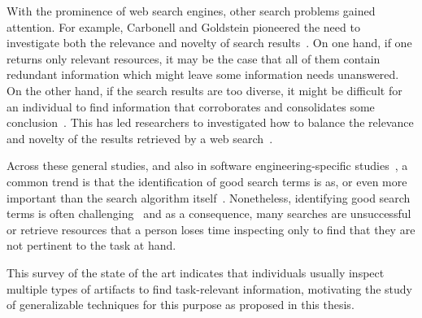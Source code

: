 With the prominence of web search engines, other search problems gained attention.
For example,  Carbonell and Goldstein pioneered the need 
to investigate both the relevance and novelty of search results~\cite{Carbonell1998}.
On one hand, if one returns only relevant resources, it may be the case that all of them contain redundant information 
which might leave some information needs unanswered. 
On the other hand, if the search results are too diverse, it might be difficult for an individual 
to find information that corroborates and consolidates some conclusion~\cite{clark2013relevance}.  
This has led researchers to investigated 
how to balance the relevance and novelty of the results retrieved
by a web search~\cite{najork2001, rafiei2010, vieira2011}. 





Across these general studies, and also in software engineering-specific studies~\cite{Starke2009, Brandt2009a, DeGraaf2014},
a common trend is that the identification of good search terms is as, or even more
important than the search algorithm itself~\cite{Kevic2014}. 
Nonetheless, identifying good search terms is often challenging~\cite{novotny2004don, Haiduc2013} and 
as a consequence, many searches are unsuccessful or retrieve resources that 
a person loses time inspecting only to find that they are not pertinent to the task at hand.


This survey of the state of the art indicates that individuals usually inspect multiple types of artifacts 
to find task-relevant information, motivating the study of generalizable techniques 
for this purpose as proposed in this thesis.





